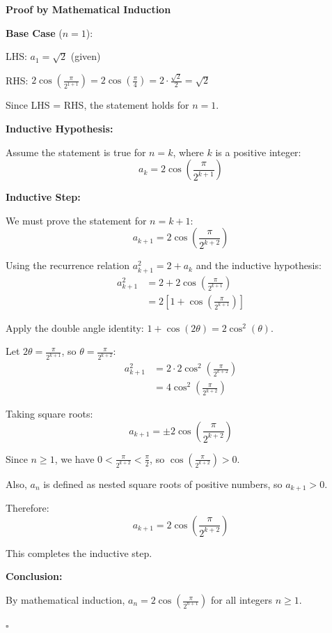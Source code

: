\begin{solution}
\textbf{Proof by Mathematical Induction}

\textbf{Base Case} ($n=1$):

LHS: $a_1 = \sqrt{2}$ (given)

RHS: $2\cos\left(\frac{\pi}{2^{1+1}}\right) = 2\cos\left(\frac{\pi}{4}\right) = 2 \cdot \frac{\sqrt{2}}{2} = \sqrt{2}$

Since LHS = RHS, the statement holds for $n=1$. \checkmark

\vspace{0.5em}
\textbf{Inductive Hypothesis:}

Assume the statement is true for $n=k$, where $k$ is a positive integer:
\[ a_k = 2\cos\left(\frac{\pi}{2^{k+1}}\right) \]

\vspace{0.5em}
\textbf{Inductive Step:}

We must prove the statement for $n=k+1$:
\[ a_{k+1} = 2\cos\left(\frac{\pi}{2^{k+2}}\right) \]

Using the recurrence relation $a_{k+1}^2 = 2 + a_k$ and the inductive hypothesis:
\begin{align*}
    a_{k+1}^2 &= 2 + 2\cos\left(\frac{\pi}{2^{k+1}}\right) \\
    &= 2\left[1 + \cos\left(\frac{\pi}{2^{k+1}}\right)\right]
\end{align*}

Apply the double angle identity: $1 + \cos(2\theta) = 2\cos^2(\theta)$.

Let $2\theta = \frac{\pi}{2^{k+1}}$, so $\theta = \frac{\pi}{2^{k+2}}$:
\begin{align*}
    a_{k+1}^2 &= 2 \cdot 2\cos^2\left(\frac{\pi}{2^{k+2}}\right) \\
    &= 4\cos^2\left(\frac{\pi}{2^{k+2}}\right)
\end{align*}

Taking square roots:
\[ a_{k+1} = \pm 2\cos\left(\frac{\pi}{2^{k+2}}\right) \]

Since $n \geq 1$, we have $0 < \frac{\pi}{2^{k+2}} < \frac{\pi}{2}$, so $\cos\left(\frac{\pi}{2^{k+2}}\right) > 0$.

Also, $a_n$ is defined as nested square roots of positive numbers, so $a_{k+1} > 0$.

Therefore:
\[ a_{k+1} = 2\cos\left(\frac{\pi}{2^{k+2}}\right) \]

This completes the inductive step. \checkmark

\vspace{0.5em}
\textbf{Conclusion:}

By mathematical induction, $a_n = 2\cos\left(\frac{\pi}{2^{n+1}}\right)$ for all integers $n \geq 1$.

\hfill $\square$
\end{solution}

